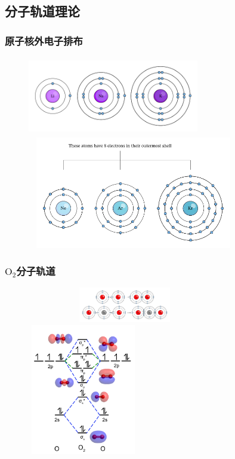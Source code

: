 \subsection{分子轨道理论}
\frame
{
	\frametitle{原子核外电子排布}
\begin{figure}[h!]
\vspace*{-0.35in}
\centering
\includegraphics[height=1.35in,width=2.95in,viewport=0 0 500 230,clip]{Figures/Li-Na-K.png}
\includegraphics[height=1.92in,width=3.65in,viewport=0 0 500 275,clip]{Figures/Ne-Ar-Kr.png}
\label{Electron_in_atom}
\end{figure}
}

\frame
{
	\frametitle{$\mathrm{O}_2$分子轨道}
\begin{figure}[h!]
\centering
\vspace{-15.5pt}
\includegraphics[height=0.60in,width=3.35in,viewport=0 100 500 200,clip]{Figures/Octet-Rule-O2_CO2.png}
\includegraphics[height=2.25in,width=1.90in,viewport=0 0 150 170,clip]{Figures/MO-O2.png}
\label{MO:O2}
\end{figure}
}

